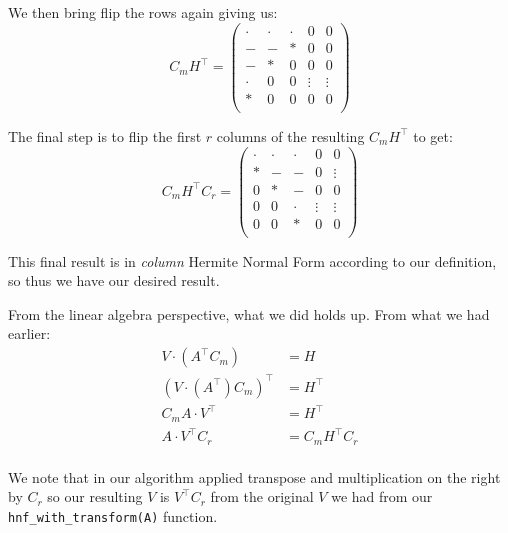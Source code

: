 \documentclass[oneside, a4paper, onecolumn, 11pt]{article}
\begin{document}
We then bring flip the rows again giving us:
\[
    C_m H^\intercal = \left(
    \begin{array}{ccccc}
            \cdot & \cdot & \cdot & 0      & 0      \\
            -     & -     & *     & 0      & 0      \\
            -     & *     & 0     & 0      & 0      \\
            \cdot & 0     & 0     & \vdots & \vdots \\
            *     & 0     & 0     & 0      & 0      \\
        \end{array}
    \right)
\]

The final step is to flip the first \(r\) columns of the resulting \(C_m H^\intercal\) to get:
\[
    C_m H^\intercal C_r = \left(
    \begin{array}{ccccc}
            \cdot & \cdot & \cdot & 0      & 0      \\
            *     & -     & -     & 0      & \vdots \\
            0     & *     & -     & 0      & 0      \\
            0     & 0     & \cdot & \vdots & \vdots \\
            0     & 0     & *     & 0      & 0      \\
        \end{array}
    \right)
\]

This final result is in \textit{column} Hermite Normal Form according to our definition, so thus we have our desired result.

From the linear algebra perspective, what we did holds up. From what we had earlier:
\begin{align*}
    V \cdot (A^\intercal C_m)             & = H                   \\
    (V \cdot (A^\intercal) C_m)^\intercal & = H^\intercal         \\
    C_m A \cdot V^\intercal               & = H^\intercal         \\
    A \cdot V^\intercal C_r               & = C_m H^\intercal C_r \\
\end{align*}

We note that in our algorithm applied transpose and multiplication on the right by \(C_r\) so our resulting \(V\) is \(V^\intercal C_r\) from the original \(V\) we had from our \texttt{hnf\_with\_transform(A)} function.
\end{document}
